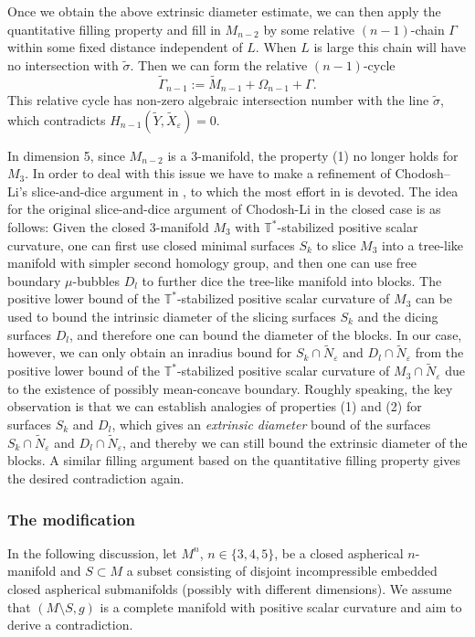 \documentclass[11pt, reqno]{amsart}
\numberwithin{equation}{section}
\theoremstyle{definition}
\newcommand{\ve}{\varepsilon}
\newcommand{\ti}[1]{\tilde{#1}}
\begin{document}
Once we obtain the above extrinsic diameter estimate, we can then apply the quantitative filling property and fill in $M_{n-2}$ by some relative $(n-1)$-chain $\Gamma$ within some fixed distance independent of $L$. When $L$ is large this chain will have no intersection with $\ti \sigma$. Then we can form the relative $(n-1)$-cycle $$\tilde \Gamma_{n-1}:=\tilde M_{n-1}+\Omega_{n-1}+\Gamma.$$
This relative cycle has non-zero algebraic intersection number with the line $\ti \sigma$, which contradicts $H_{n-1}(\tilde Y, \ti X_{\ve}) = 0$.

In dimension 5, since $M_{n-2}$ is a 3-manifold, the property (1) no longer holds for $M_3$. In order to deal with this issue we have to make a refinement of Chodosh--Li's slice-and-dice argument in \cite{CL20}, to which the most effort in \cite{CCZ23} is devoted.
The idea for the original slice-and-dice argument of Chodosh-Li in the closed case  is as follows: Given the closed 3-manifold $M_3$ with $\mathbb{T}^{*}$-stabilized positive scalar curvature, one can first use closed minimal surfaces $S_k$ to slice $M_3$ into a tree-like manifold with simpler second homology group, and then one can use free boundary $\mu$-bubbles $D_l$ to further dice the tree-like manifold into blocks.
The positive lower bound of the $\mathbb{T}^{*}$-stabilized positive scalar curvature of $M_3$ can be used to bound the intrinsic diameter of the slicing surfaces $S_k$ and the dicing surfaces $D_l$, and therefore one can bound the diameter of the blocks.
In our case, however, we can only obtain an inradius bound for $S_k \cap \ti N_\ve$ and $D_l \cap \ti N_\ve$ from the positive lower bound of the $\mathbb{T}^{*}$-stabilized positive scalar curvature of $M_3\cap \tilde N_{\ve}$ due to the existence of possibly mean-concave boundary. Roughly speaking, the key observation is that
we can establish analogies of properties (1) and (2) for surfaces $S_k$ and $D_l$,
which gives an \emph{extrinsic diameter} bound of the surfaces $S_k \cap \ti N_\ve$ and $D_l \cap \ti N_\ve$, and thereby we can still bound the extrinsic diameter of the blocks. A similar filling argument based on the quantitative filling property gives the desired contradiction again.



\subsubsection{The modification}
In the following discussion, let $M^n$, $n\in\{3,4,5\}$, be a closed aspherical $n$-manifold and $S\subset M$ a subset consisting of disjoint incompressible embedded closed aspherical   submanifolds (possibly with different dimensions). We assume that $(M\setminus S, g)$ is a complete manifold with positive scalar curvature and aim to derive a contradiction.
\end{document}
